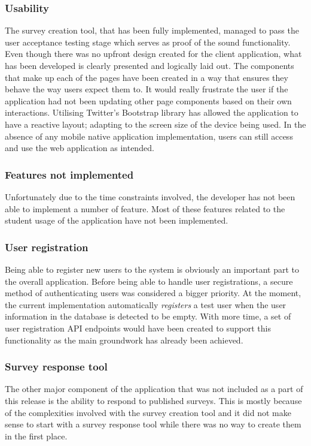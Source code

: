 \subsubsection*{Usability}
The survey creation tool, that has been fully implemented, managed to pass the user acceptance testing stage which serves as proof of 
the sound functionality.
Even though there was no upfront design created for the client application, what has been developed is clearly presented and logically laid
out.
The components that make up each of the pages have been created in a way that ensures they behave the way users expect them to.
It would really frustrate the user if the application had not been updating other page components based on their own interactions.
Utilising Twitter's Bootstrap library has allowed the application to have a reactive layout; adapting to the screen size of the device being used.
In the absence of any mobile native application implementation, users can still access and use the web application as intended.

\subsubsection{Features not implemented}
Unfortunately due to the time constraints involved, the developer has not been able to implement a number of feature.
Most of these features related to the student usage of the application have not been implemented.

\subsubsection*{User registration}
Being able to register new users to the system is obviously an important part to the overall application. 
Before being able to handle user registrations, a secure method of authenticating users was considered a bigger priority.  
At the moment, the current implementation automatically \emph{registers} a test user when the user information in the database is detected to be 
empty.
With more time, a set of user registration API endpoints would have been created to support this functionality as the main groundwork has already 
been achieved.

\subsubsection*{Survey response tool}
The other major component of the application that was not included as a part of this release is the ability to respond to published surveys.
This is mostly because of the complexities involved with the survey creation tool and it did not make sense to start with a survey response tool
while there was no way to create them in the first place.

